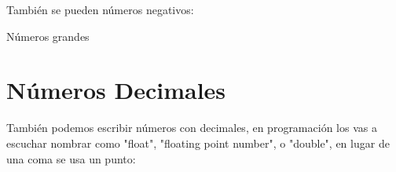 \documentclass[letterpaper,10pt,spanish]{sphinxmanual}
\begin{document}
%
\begin{sphinxVerbatim}[commandchars=\\\{\}]
\end{sphinxVerbatim}

%
\begin{sphinxVerbatim}[commandchars=\\\{\}]
 
\end{sphinxVerbatim}

También se pueden números negativos:

%
\begin{sphinxVerbatim}[commandchars=\\\{\}]
\end{sphinxVerbatim}

%
\begin{sphinxVerbatim}[commandchars=\\\{\}]
 
\end{sphinxVerbatim}

Números grandes

%
\begin{sphinxVerbatim}[commandchars=\\\{\}]
\end{sphinxVerbatim}

%
\begin{sphinxVerbatim}[commandchars=\\\{\}]
 
\end{sphinxVerbatim}


\section{Números Decimales}
\label{\detokenize{datos-con-javascript:id1}}
También podemos escribir números con decimales, en programación los vas a
escuchar nombrar como "float", "floating point number", o "double", en lugar de
una coma se usa un punto:

%
\begin{sphinxVerbatim}[commandchars=\\\{\}]
\end{sphinxVerbatim}

%
\begin{sphinxVerbatim}[commandchars=\\\{\}]
 
\end{sphinxVerbatim}
\end{document}
